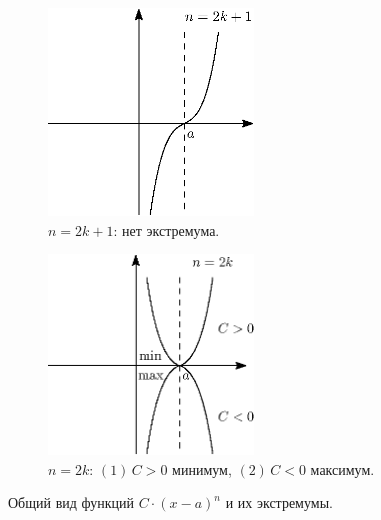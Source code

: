 \documentclass[12pt]{article}
\theoremstyle{definition}
\begin{document}
\begin{figure}[H]
	\begin{subfigure}[b]{0.5\textwidth}
		\centering
		\includegraphics[width=0.6\textwidth]{27_3.eps}
		\caption{$n = 2k+1$: нет экстремума.}
		\label{27_3}
	\end{subfigure}%
	\begin{subfigure}[b]{0.5\textwidth}
		\centering
		\includegraphics[width=0.6\textwidth]{27_4.eps}
		\caption{$n = 2k$: $(1) \, C > 0$ минимум, $(2) \, C < 0$ максимум.}
		\label{27_4}
	\end{subfigure}
	\caption{Общий вид функций $C{\cdot}(x-a)^n$ и их экстремумы.}
\end{figure}
\end{document}
